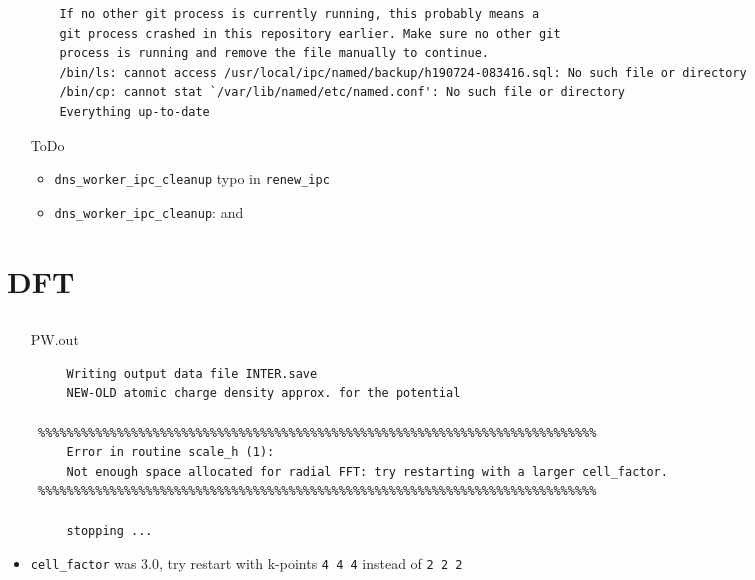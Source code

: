 \documentclass[letterpaper,11pt]{article}
\begin{document}
\begin{itemize}
\begin{verbatim}
    If no other git process is currently running, this probably means a                                                                                                                                                
    git process crashed in this repository earlier. Make sure no other git                                                                                                                                             
    process is running and remove the file manually to continue.                                                                                                                                                       
    /bin/ls: cannot access /usr/local/ipc/named/backup/h190724-083416.sql: No such file or directory                                                                                                                   
    /bin/cp: cannot stat `/var/lib/named/etc/named.conf': No such file or directory                                                                                                                                    
    Everything up-to-date
	\end{verbatim}
	\item[ToDo] 
	\begin{itemize}
		\item \verb|dns_worker_ipc_cleanup| typo in \verb|renew_ipc|
		\item \verb|dns_worker_ipc_cleanup|:
		 and 
	\end{itemize}

\end{itemize}


\section*{DFT}

\subsection*{}
\begin{itemize}
\item[PW.out]
\begin{verbatim}
     Writing output data file INTER.save
     NEW-OLD atomic charge density approx. for the potential

 %%%%%%%%%%%%%%%%%%%%%%%%%%%%%%%%%%%%%%%%%%%%%%%%%%%%%%%%%%%%%%%%%%%%%%%%%%%%%%
     Error in routine scale_h (1):
     Not enough space allocated for radial FFT: try restarting with a larger cell_factor.
 %%%%%%%%%%%%%%%%%%%%%%%%%%%%%%%%%%%%%%%%%%%%%%%%%%%%%%%%%%%%%%%%%%%%%%%%%%%%%%

     stopping ...
\end{verbatim}
\item \verb|cell_factor| was $3.0$, try restart with k-points \verb|4 4 4| instead of \verb|2 2 2|

\end{itemize}







\newpage
\end{document}

